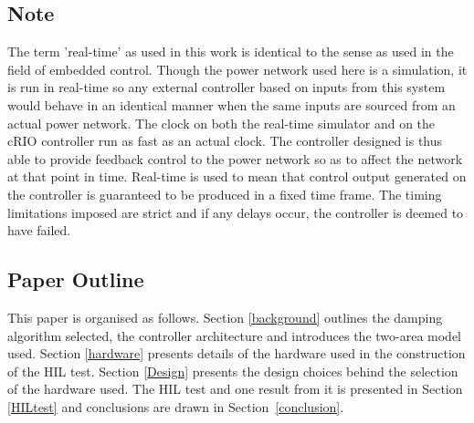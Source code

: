 \documentclass[conference]{IEEEtran}
\begin{document}
\subsection*{Note}
The term 'real-time' as used in this work is identical to the sense as used in the field of embedded control\cite{Real-Time}. Though the power network used here is a simulation, it is run in real-time so any external controller based on inputs from this system would behave in an identical manner when the same inputs are sourced from an actual power network. The clock on both the real-time simulator and on the cRIO controller run as fast as an actual clock. The controller
designed is thus able to provide feedback control to the power network so as to affect the network at that point in time. Real-time is used to mean that control output generated on the controller is guaranteed to be produced in a fixed time frame. The timing limitations imposed are strict and if any delays occur, the controller is deemed to have failed. 





\subsection{Paper Outline}
This paper is organised as follows. Section \ref{background} outlines the damping algorithm selected, the controller architecture and introduces the two-area model used. Section \ref{hardware} presents details of the hardware used in the construction of the HIL test. Section \ref{Design} presents the design choices behind the selection of the hardware used. The HIL test and one result from it is presented in Section \ref{HILtest} and conclusions are drawn in Section~\ref{conclusion}.
\end{document}
